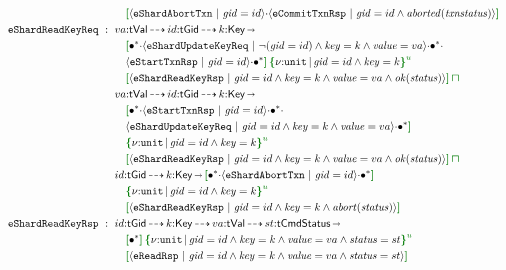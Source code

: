 {\begin{align*}
  \\ & \quad \effL{} \msg{eShardAbortTxn}{\I{gid}=id}\seqA\msg{eCommitTxnRsp}{\I{gid}=id\land\mathit{aborted}(\I{txnstatus})} \effR{}
  \\
  \eff{eShardReadKeyReq} ~:~{}
  & va{:}\mathsf{tVal}\garr id{:}\mathsf{tGid}\garr k{:}\mathsf{Key} \sarr {}
  \\ & \quad \effL{} \allA\seqA\msg{eShardUpdateKeyReq}{\neg(\I{gid}=id)\land\I{key}=k\land\I{value}=va}\seqA\allA\seqA
  \\ & \quad \msg{eStartTxnRsp}{\I{gid}=id}\seqA\allA \effR{}\,\urt{\Code{unit}}{\I{gid}=id\land\I{key}=k}\,
  \\ & \quad \effL{} \msg{eShardReadKeyRsp}{\I{gid}=id\land\I{key}=k\land\I{value}=va\land\mathit{ok}(\I{status})} \effR{} \interty
  \\
  & va{:}\mathsf{tVal}\garr id{:}\mathsf{tGid}\garr k{:}\mathsf{Key} \sarr {}
  \\ & \quad \effL{} \allA\seqA\msg{eStartTxnRsp}{\I{gid}=id}\seqA\allA\seqA
  \\ & \quad \msg{eShardUpdateKeyReq}{\I{gid}=id\land\I{key}=k\land\I{value}=va}\seqA\allA \effR{}\,
  \\ & \quad \urt{\Code{unit}}{\I{gid}=id\land\I{key}=k}\,
  \\ & \quad \effL{} \msg{eShardReadKeyRsp}{\I{gid}=id\land\I{key}=k\land\I{value}=va\land\mathit{ok}(\I{status})} \effR{} \interty
  \\
  & id{:}\mathsf{tGid}\garr k{:}\mathsf{Key} \sarr \effL{} \allA\seqA\msg{eShardAbortTxn}{\I{gid}=id}\seqA\allA \effR{}\,
  \\ & \quad \urt{\Code{unit}}{\I{gid}=id\land\I{key}=k}\,
  \\ & \quad \effL{} \msg{eShardReadKeyRsp}{\I{gid}=id\land\I{key}=k\land\mathit{abort}(\I{status})} \effR{} 
  \\
  \eff{eShardReadKeyRsp} ~:~{}
  & id{:}\mathsf{tGid}\garr k{:}\mathsf{Key}\garr va{:}\mathsf{tVal}\garr st{:}\mathsf{tCmdStatus} \sarr 
  \\ & \quad \effL{} \allA \effR{}\,\urt{\Code{unit}}{\I{gid}=id\land\I{key}=k\land\I{value}=va\land\I{status}=st}\,
  \\ & \quad \effL{} \msg{eReadRsp}{\I{gid}=id\land\I{key}=k\land\I{value}=va\land\I{status}=st} \effR{}
\end{align*}}
\vspace{-.4cm}\par\nobreak\noindent

